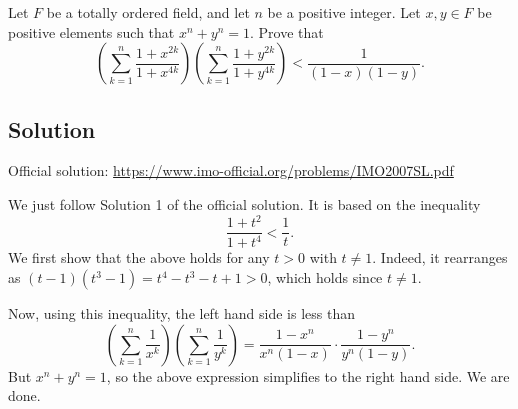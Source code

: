 Let $F$ be a totally ordered field, and let $n$ be a positive integer.
Let $x, y \in F$ be positive elements such that $x^n + y^n = 1$.
Prove that
\[ \left(\sum_{k = 1}^n \frac{1 + x^{2k}}{1 + x^{4k}}\right) \left(\sum_{k = 1}^n \frac{1 + y^{2k}}{1 + y^{4k}}\right) < \frac{1}{(1 - x)(1 - y)}. \]



\subsection*{Solution}

Official solution: \url{https://www.imo-official.org/problems/IMO2007SL.pdf}

We just follow Solution 1 of the official solution.
It is based on the inequality
\[ \frac{1 + t^2}{1 + t^4} < \frac{1}{t}. \]
We first show that the above holds for any $t > 0$ with $t \neq 1$.
Indeed, it rearranges as $(t - 1)(t^3 - 1) = t^4 - t^3 - t + 1 > 0$, which holds since $t \neq 1$.

Now, using this inequality, the left hand side is less than
\[ \left(\sum_{k = 1}^n \frac{1}{x^k}\right) \left(\sum_{k = 1}^n \frac{1}{y^k}\right) = \frac{1 - x^n}{x^n (1 - x)} \cdot \frac{1 - y^n}{y^n (1 - y)}. \]
But $x^n + y^n = 1$, so the above expression simplifies to the right hand side.
We are done.
